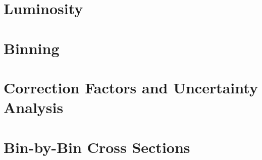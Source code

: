 \section{Luminosity}\label{sec:luminosity}
    
    \clearpage
\section{Binning}\label{sec:Ch4_binning}
    
    \clearpage
\section{Correction Factors and Uncertainty Analysis}\label{sec:Ch4_corr_factors}
    
    \clearpage

\section{Bin-by-Bin Cross Sections}\label{sec:Ch4_cross_section}
    
    \clearpage
    

\iffalse

For each kinematic bin the differential cross section can be written as:

\begin{equation}
    \sigma = \frac{N_{meas}}{L \epsilon}\frac{1}{\delta}
\end{equation}

Where $\frac{N_{meas}}{L}$ is the number of events from experiment normalized by the integrated luminosity before acceptance and radiatvie corrections. $\epsilon$ = $\frac{N^{RAD}_{rec}}{{N^{RAD}_{gen}}}$ is the acceptance correction and $\delta$ is the radiative correction.



$\delta$ can be obtained by using the following:

\begin{equation}
    \delta = \frac{N^{RAD}_{gen}}{N^{NORAD}_{gen}}
\end{equation}

$\delta$ and $\epsilon$ need to be properly calculated, but for a first pass we will ignore them so we have just
\fi



